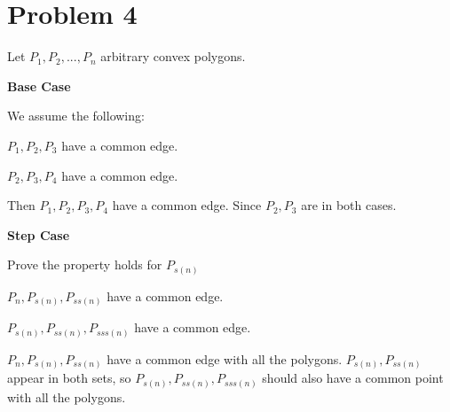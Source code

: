 \documentclass{article}
\begin{document}
\section {Problem 4}

Let $P_1,P_2,...,P_n$ arbitrary convex polygons.

{\bf Base Case} 

We assume the following:
\begin{itemize}
  {\item $P_1,P_2,P_3$ have a common edge.}
  {\item $P_2,P_3,P_4$ have a common edge.}

\end{itemize}

Then $P_1,P_2,P_3,P_4$ have a common edge. Since $P_2,P_3$ are in both cases.

{\bf Step Case}

Prove the property holds for $P_{s(n)}$
\begin{itemize}
  {\item $P_n,P_{s(n)},P_{ss(n)}$ have a common edge.}
  {\item $P_{s(n)},P_{ss(n)},P_{sss(n)}$ have a common edge.}
\end{itemize}

$P_n,P_{s(n)},P_{ss(n)}$ have a common edge with all the polygons. $P_{s(n)},P_{ss(n)}$ appear in both sets, so $P_{s(n)},P_{ss(n)},P_{sss(n)}$ should also have a common point with all the polygons.
  
\end{document}
